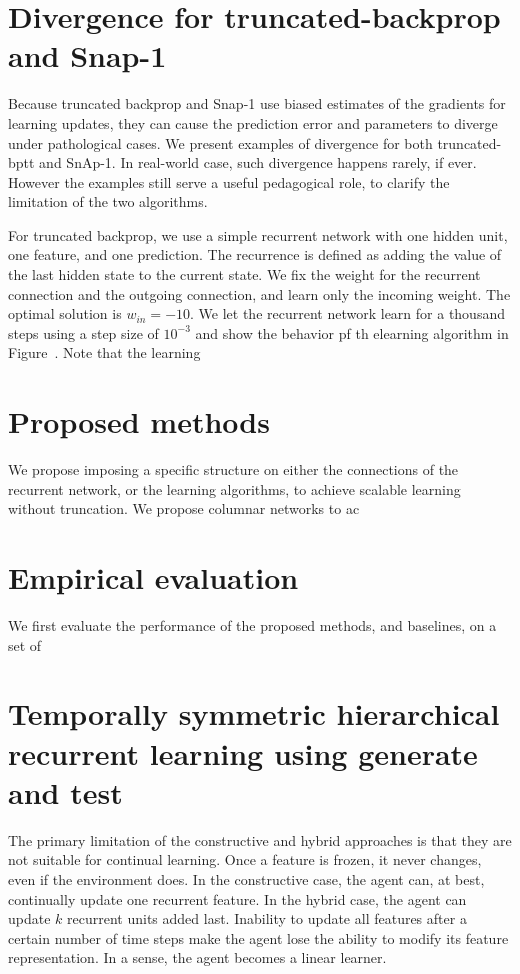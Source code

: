 \documentclass[twoside,11pt]{article}
\begin{document}
\section{Divergence for truncated-backprop and Snap-1}
Because truncated backprop and Snap-1 use biased estimates of the gradients for learning updates, they can cause the prediction error and parameters to diverge under pathological cases. We present examples of divergence for both truncated-bptt and SnAp-1. In real-world case, such divergence happens rarely, if ever. However the examples still serve a useful pedagogical role, to clarify the limitation of the two algorithms. 

For truncated backprop, we use a simple recurrent network with one hidden unit, one feature, and one prediction. The recurrence is defined as adding the value of the last hidden state to the current state. We fix the weight for the recurrent connection and the outgoing connection, and learn only the incoming weight. The optimal solution is $w_{in} = -10$. We let the recurrent network learn for a thousand steps using a step size of $10^{-3}$ and show the behavior pf th elearning algorithm in Figure~. Note that the learning 
\section{Proposed methods} 
We propose imposing a specific structure on either the connections of the recurrent network, or the learning algorithms, to achieve scalable learning without truncation. We propose columnar networks to ac

\section{Empirical evaluation} 
We first evaluate the performance of the proposed methods, and baselines, on a set of 
\section{Temporally symmetric hierarchical recurrent learning using generate and test}  
The primary limitation of the constructive and hybrid approaches is that they are not suitable for continual learning. Once a feature is frozen, it never changes, even if the environment does. In the constructive case, the agent can, at best, continually update one recurrent feature. In the hybrid case, the agent can update $k$ recurrent units added last. Inability to update all features after a certain number of time steps  make the agent lose the ability to  modify its feature representation. In a sense, the agent becomes a linear learner. 
\end{document}
